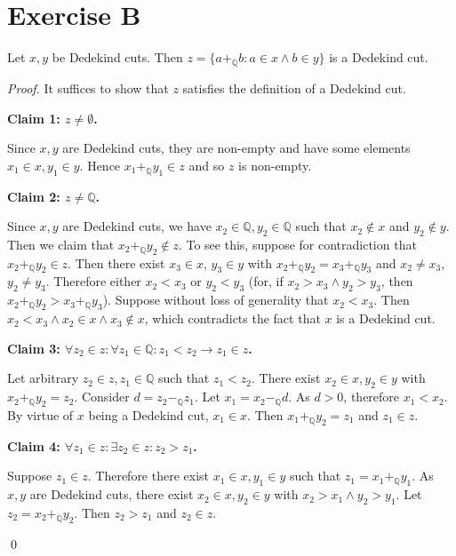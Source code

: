 \documentclass[11pt]{llncs}
\begin{document}
\section*{Exercise B}
\begin{lemma}
  Let $x, y$ be Dedekind cuts. Then
  $z = \{a +_\mathbb{Q} b: a \in x \land b \in y\}$ is a Dedekind cut.
\end{lemma}
\begin{proof}
It suffices to show that $z$ satisfies the definition of a Dedekind cut.

\textbf{Claim 1: $z \neq \emptyset$.}

Since $x, y$ are Dedekind cuts, they are non-empty and have some elements
$x_1 \in x, y_1 \in y$. Hence $x_1 +_\mathbb{Q} y_1 \in z$ and so $z$ is
non-empty.

\textbf{Claim 2: $z \neq \mathbb{Q}$.}

Since $x, y$ are Dedekind cuts, we have
$x_2 \in \mathbb{Q}, y_2 \in \mathbb{Q}$ such that $x_2 \not\in x$ and
$y_2 \not\in y$. Then we claim that $x_2 +_\mathbb{Q} y_2 \not\in z$. To see
this, suppose for contradiction that $x_2 +_\mathbb{Q} y_2 \in z$. Then there exist $x_3 \in x$,
$y_3 \in y$ with $x_2 +_\mathbb{Q} y_2 = x_3 +_\mathbb{Q} y_3$ and
$x_2 \neq x_3$, $y_2 \neq y_3$. Therefore either $x_2 < x_3$ or $y_2 < y_3$
(for, if $x_2 > x_3 \land y_2 > y_3$, then $x_2 +_\mathbb{Q} y_2 > x_3 +_\mathbb{Q} y_3$).
Suppose without loss of generality that
$x_2 < x_3$. Then
$x_2 < x_3 \land x_2 \in x \land x_3 \not\in x$, which contradicts the fact that
$x$ is a Dedekind cut.

\textbf{Claim 3: $\forall z_2 \in z: \forall z_1 \in \mathbb{Q}: z_1 < z_2 \rightarrow z_1 \in z$.}

Let arbitrary $z_2 \in z, z_1 \in \mathbb{Q}$ such that $z_1 < z_2$. There exist
$x_2 \in x, y_2 \in y$ with $x_2 +_\mathbb{Q} y_2 = z_2$. Consider
$d = z_2 -_\mathbb{Q} z_1$. Let $x_1 = x_2 -_\mathbb{Q} d$. As $d > 0$,
therefore $x_1 < x_2$. By virtue of $x$ being a Dedekind cut, $x_1 \in x$. Then
$x_1 +_\mathbb{Q} y_2 = z_1$ and $z_1 \in z$.

\textbf{Claim 4: $\forall z_1 \in z: \exists z_2 \in z: z_2 > z_1$.}

Suppose $z_1 \in z$. Therefore there exist $x_1 \in x, y_1 \in y$ such that
$z_1 = x_1 +_\mathbb{Q} y_1$. As $x, y$ are Dedekind cuts, there exist
$x_2 \in x, y_2 \in y$ with $x_2 > x_1 \land y_2 > y_1$. Let
$z_2 = x_2 +_\mathbb{Q} y_2$. Then $z_2 > z_1$ and $z_2 \in z$.

\qed
\end{proof}
\end{document}
